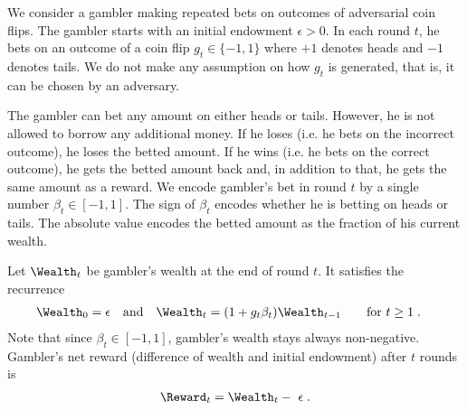 % 
% 

We consider a gambler making repeated bets on outcomes of adversarial coin
flips. The gambler starts with an initial endowment $\epsilon > 0$. In each
round $t$, he bets on an outcome of a coin flip $g_t \in \{-1,1\}$ where $+1$
denotes heads and $-1$ denotes tails. We do not make any assumption on how $g_t$
is generated, that is, it can be chosen by an adversary.

The gambler can bet any amount on either heads or tails. However, he is not
allowed to borrow any additional money. If he loses (i.e. he bets on the
incorrect outcome), he loses the betted amount. If he wins (i.e. he bets on the
correct outcome), he gets the betted amount back and, in addition to that, he
gets the same amount as a reward.
We encode gambler's bet in round $t$ by a single
number $\beta_t \in [-1,1]$. The sign of $\beta_t$ encodes whether he is betting
on heads or tails. The absolute value encodes the betted amount as the fraction
of his current wealth.

Let $\Wealth_t$ be gambler's wealth at the end of round $t$. It satisfies the
recurrence
\begin{align}
\label{equation:wealth-recurrence}
\Wealth_0 & = \epsilon &
& \text{and} &
\Wealth_t & = (1 + g_t \beta_t) \Wealth_{t-1} \qquad \text{for $t \ge 1$} \; .
\end{align}
Note that since $\beta_t \in [-1,1]$, gambler's wealth stays always non-negative.
Gambler's net reward (difference of wealth and initial endowment) after $t$
rounds is
\begin{align}
\label{equation:reward-wealth}
\Reward_t = \Wealth_t - \ \epsilon \; .
\end{align}

